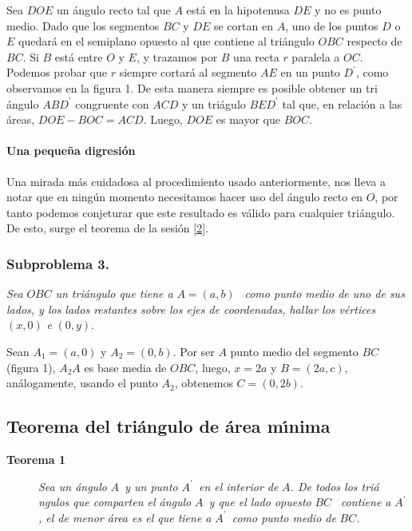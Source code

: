 \documentclass[a4paper,spanish]{article}
\begin{document}
Sea $DOE$ un \'{a}ngulo recto tal que $A$ est\'{a} en la hipotenusa $DE$ y
no es punto medio. Dado que los segmentos $BC$ y $DE$ se cortan en $A$, uno
de los puntos $D$ o $E$ quedar\'{a} en el semiplano opuesto al que contiene
al tri\'{a}ngulo $OBC$ respecto de $BC$. Si $B$ est\'{a} entre $O$ y $E$, y
trazamos por $B$ una recta $r$ paralela a $OC$. Podemos probar que $r$
siempre cortar\'{a} al segmento $AE$ en un punto $D^{\prime }$, como
observamos en la figura 1. De esta manera siempre es posible obtener un tri%
\'{a}ngulo $ABD^{\prime }$ congruente con $ACD$ y un tri\'{a}gulo $%
BED^{\prime }$ tal que, en relaci\'{o}n a las \'{a}reas, $DOE-BOC=ACD$.
Luego, $DOE$ es mayor que $BOC$.

\paragraph{Una peque\~{n}a digresi\'{o}n}

Una mirada m\'{a}s cuidadosa al procedimiento usado anteriormente, nos lleva
a notar que en ning\'{u}n momento necesitamos hacer uso del \'{a}ngulo recto
en $O$, por tanto podemos conjeturar que este resultado es v\'{a}lido para
cualquier tri\'{a}ngulo. De esto, surge el teorema de la sesi\'{o}n \ref{2}.

\subsubsection{Subproblema 3.}

\emph{Sea }$OBC$ \emph{un tri\'{a}ngulo que tiene a }$A=\left( a,b\right) $%
\emph{\ como punto medio de uno de sus lados, y los lados restantes sobre
los ejes de coordenadas, hallar los v\'{e}rtices }$\left( x,0\right) $ \emph{%
e} $\left( 0,y\right) $.

Sean $A_{1}=\left( a,0\right) $ y $A_{2}=\left( 0,b\right) $. Por ser $A$
punto medio del segmento $BC$ (figura 1), $A_{2}A$ es base media de $OBC$,
luego, $x=2a$ y $B=\left( 2a,c\right) $, an\'{a}logamente, usando el punto $%
A_{2}$, obtenemos $C=\left( 0,2b\right) $.

\subsection{Teorema del tri\'{a}ngulo de \'{a}rea m\'{\i}nima\label{2}}

\begin{description}
\item[\textbf{Teorema 1}] \emph{Sea un \'{a}ngulo }$A$\emph{\ y un punto }$%
A^{\prime }$\emph{\ en el interior de }$A$\emph{. De todos los tri\'{a}%
ngulos que comparten el \'{a}ngulo }$A$\emph{\ y que el lado opuesto }$BC$%
\emph{\ contiene a }$A^{\prime }$\emph{, el de menor \'{a}rea es el que
tiene a }$A^{\prime }$\emph{\ como punto medio de }$BC$\emph{.}
\end{description}
\end{document}
